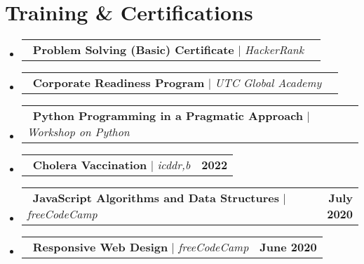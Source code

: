 \documentclass[letterpaper,11pt]{article}
\makeatletter
\newcommand{\resumeProjectHeading}[2]{
    \item
    \begin{tabular*}{1.001\textwidth}{l@{\extracolsep{\fill}}r}
      \small#1 & \textbf{\small \color{primarycolor}#2}\\
    \end{tabular*}\vspace{-7pt}
}
\newcommand{\resumeSubHeadingListStart}{\begin{itemize}[leftmargin=0.0in, label={}]}
\newcommand{\resumeSubHeadingListEnd}{\end{itemize}}
\makeatother
\begin{document}
\section{Training \& Certifications}
\vspace{2pt}
    \resumeSubHeadingListStart
      \resumeProjectHeading
          {\faCertificate\ \textbf{\color{accentcolor}Problem Solving (Basic) Certificate} $|$ \emph{HackerRank}}{}
          \vspace{-10pt}
      \resumeProjectHeading
          {\faCertificate\ \textbf{\color{accentcolor}Corporate Readiness Program} $|$ \emph{UTC Global Academy}}{}
          \vspace{-10pt}
      \resumeProjectHeading
          {\faCertificate\ \textbf{\color{accentcolor}Python Programming in a Pragmatic Approach} $|$ \emph{Workshop on Python}}{}
          \vspace{-10pt}
      \resumeProjectHeading
          {\faCertificate\ \textbf{\color{accentcolor}Cholera Vaccination} $|$ \emph{icddr,b}}{2022}
          \vspace{-10pt}
      \resumeProjectHeading
          {\faCertificate\ \textbf{\color{accentcolor}JavaScript Algorithms and Data Structures} $|$ \emph{freeCodeCamp}}{July 2020}
          \vspace{-10pt}
      \resumeProjectHeading
          {\faCertificate\ \textbf{\color{accentcolor}Responsive Web Design} $|$ \emph{freeCodeCamp}}{June 2020}
    \resumeSubHeadingListEnd
\end{document}
